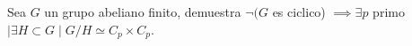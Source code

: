 \question
Sea $G$ un grupo abeliano finito, demuestra
$\neg(G$ es ciclico) $\implies 
\exists p $ primo 
$\mid \exists H \subset G \mid G/H \simeq C_p \times C_p$.